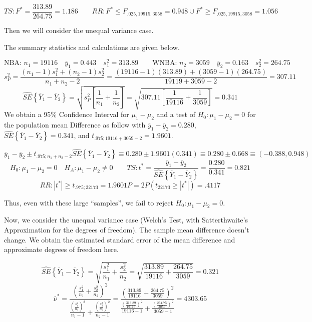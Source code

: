 \documentclass[
]{book}
\begin{document}
\[
TS: F^*=\frac{313.89}{264.75}=1.186 \qquad RR: F^*\leq F_{.025,19915,3058}= 0.948 \cup
F^*\geq F_{.025,19915,3058}= 1.056
\]

Then we will consider the unequal variance case.

The summary statistics and calculations are given below.

\[
\mbox{NBA: } n_1=19116 \quad \overline{y}_1=0.443 \quad s_1^2 = 313.89 \qquad 
\mbox{WNBA: } n_2=3059 \quad \overline{y}_2=0.163 \quad s_2^2 = 264.75
\] \[
s_P^2 = \frac{(n_1-1)s_1^2+(n_2-1)s_2^2}{n_1+n_2-2}=
\frac{(19116-1)(313.89)+(3059-1)(264.75)}{19119+3059-2} = 307.11
\] \[
\hat{SE}\left\{\overline{Y}_1-\overline{Y}_2\right\}=
\sqrt{s_P^2\left[\frac{1}{n_1}+\frac{1}{n_2}\right]}
=\sqrt{307.11\left[\frac{1}{19116}+\frac{1}{3059}\right]}=0.341
\] We obtain a 95\% Confidence Interval for \(\mu_1-\mu_2\) and a test
of \(H_0:\mu_1-\mu_2=0\) for the population mean Difference as follow
with \(\overline{y}_1-\overline{y}_2=0.280\),
\(\hat{SE}\left\{\overline{Y}_1-\overline{Y}_2\right\}=0.341\), and
\(t_{.975;19116+3059-2}=1.9601\).

\[ \overline{y}_1-\overline{y}_2 \pm t_{.975;n_1+n_2-2}\hat{SE}\left\{\overline{Y}_1-\overline{Y}_2\right\}  \equiv  0.280 \pm 1.9601(0.341)  \equiv  0.280 \pm 0.668
 \equiv  (-0.388,0.948) 
 \] \[
H_0:\mu_1-\mu_2=0 \quad H_A:\mu_1-\mu_2\neq 0 \qquad
TS:t^*=\frac{\overline{y}_1-\overline{y}_2}{\hat{SE}\left\{\overline{Y}_1-\overline{Y}_2\right\}}=\frac{0.280}{0.341}=0.821
\] \[
RR: |t^*| \geq t_{.975;22173} = 1.9601 
P=2P\left(t_{22173}\geq|t^*|\right)=.4117
\]

Thus, even with these large ``samples'', we fail to reject
\(H_0: \mu_1-\mu_2=0\).

Now, we consider the unequal variance case (Welch's Test, with
Satterthwaite's Approximation for the degrees of freedom). The sample
mean difference doesn't change. We obtain the estimated standard error
of the mean difference and approximate degrees of freedom here.

\[
\hat{SE}\left\{\overline{Y}_1-\overline{Y}_2\right\}=
\sqrt{\frac{s_1^2}{n_1}+\frac{s_2^2}{n_2}}=\sqrt{\frac{313.89}{19116}+\frac{264.75}{3059}}
=0.321
\] \[
\hat{\nu}^* = \frac{\left(\frac{s_1^2}{n_1}+\frac{s_2^2}{n_2}\right)^2}{
\frac{\left(\frac{s_1^2}{n_1}\right)^2}{n_1-1} + 
\frac{\left(\frac{s_2^2}{n_2}\right)^2}{n_2-1}
} = 
\frac{\left(\frac{313.89}{19116}+\frac{264.75}{3059}\right)^2}{
\frac{\left(\frac{313.89}{19116}\right)^2}{19116-1} + 
\frac{\left(\frac{264.75}{3059}\right)^2}{3059-1}
}=4303.65
\]
\end{document}

